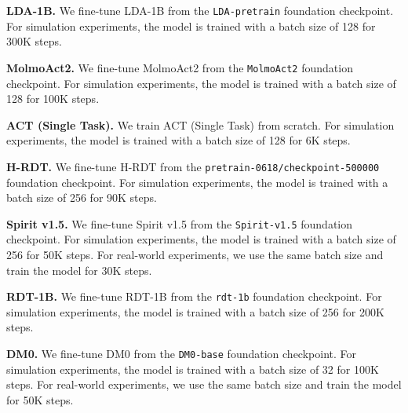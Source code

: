 \textbf{LDA-1B.}
We fine-tune LDA-1B from the \texttt{LDA-pretrain} foundation checkpoint.
For simulation experiments, the model is trained with a batch size of 128 for 300K steps.

\textbf{MolmoAct2.}
We fine-tune MolmoAct2 from the \texttt{MolmoAct2} foundation checkpoint.
For simulation experiments, the model is trained with a batch size of 128 for 100K steps.

\textbf{ACT (Single Task).}
We train ACT (Single Task) from scratch.
For simulation experiments, the model is trained with a batch size of 128 for 6K steps.

\textbf{H-RDT.}
We fine-tune H-RDT from the \texttt{pretrain-0618/checkpoint-500000} foundation checkpoint.
For simulation experiments, the model is trained with a batch size of 256 for 90K steps.

\textbf{Spirit v1.5.}
We fine-tune Spirit v1.5 from the \texttt{Spirit-v1.5} foundation checkpoint.
For simulation experiments, the model is trained with a batch size of 256 for 50K steps.
For real-world experiments, we use the same batch size and train the model for 30K steps.

\textbf{RDT-1B.}
We fine-tune RDT-1B from the \texttt{rdt-1b} foundation checkpoint.
For simulation experiments, the model is trained with a batch size of 256 for 200K steps.

\textbf{DM0.}
We fine-tune DM0 from the \texttt{DM0-base} foundation checkpoint.
For simulation experiments, the model is trained with a batch size of 32 for 100K steps.
For real-world experiments, we use the same batch size and train the model for 50K steps.
